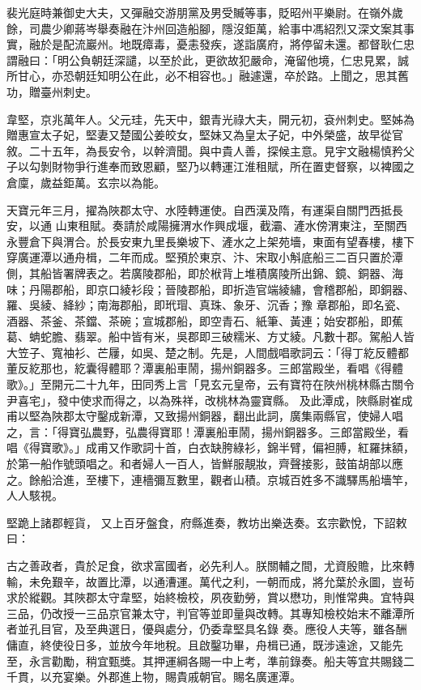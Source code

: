 \begin{pinyinscope}
 裴光庭時兼御史大夫，又彈融交游朋黨及男受贓等事，貶昭州平樂尉。在嶺外歲餘，司農少卿蔣岑舉奏融在汴州回造船腳，隱沒鉅萬，給事中馮紹烈又深文案其事實，融於是配流巖州。地既瘴毒，憂恚發疾，遂詣廣府，將停留未還。都督耿仁忠謂融曰：「明公負朝廷深譴，以至於此，更欲故犯嚴命，淹留他境，仁忠見累，誠所甘心，亦恐朝廷知明公在此，必不相容也。」融遽還，卒於路。上聞之，思其舊功，贈臺州刺史。



 韋堅，京兆萬年人。父元珪，先天中，銀青光祿大夫，開元初，袞州刺史。堅姊為贈惠宣太子妃，堅妻又楚國公姜皎女，堅妹又為皇太子妃，中外榮盛，故早從官敘。二十五年，為長安令，以幹濟聞。與中貴人善，探候主意。見宇文融楊慎矜父子以勾剝財物爭行進奉而致恩顧，堅乃以轉運江淮租賦，所在置吏督察，以裨國之倉廩，歲益鉅萬。玄宗以為能。



 天寶元年三月，擢為陜郡太守、水陸轉運使。自西漢及隋，有運渠自關門西抵長安，以通
 山東租賦。奏請於咸陽擁渭水作興成堰，截灞、滻水傍渭東注，至關西永豐倉下與渭合。於長安東九里長樂坡下、滻水之上架苑墻，東面有望春樓，樓下穿廣運潭以通舟楫，二年而成。堅預於東京、汴、宋取小斛底船三二百只置於潭側，其船皆署牌表之。若廣陵郡船，即於栿背上堆積廣陵所出錦、鏡、銅器、海味；丹陽郡船，即京口綾衫段；晉陵郡船，即折造官端綾繡，會稽郡船，即銅器、羅、吳綾、絳紗；南海郡船，即玳瑁、真珠、象牙、沉香；豫
 章郡船，即名瓷、酒器、茶釜、茶鐺、茶碗；宣城郡船，即空青石、紙筆、黃連；始安郡船，即蕉葛、蚺蛇膽、翡翠。船中皆有米，吳郡即三破糯米、方丈綾。凡數十郡。駕船人皆大笠子、寬袖衫、芒屨，如吳、楚之制。先是，人間戲唱歌詞云：「得丁紇反體都董反紇那也，紇囊得體耶？潭裏船車鬧，揚州銅器多。三郎當殿坐，看唱《得體歌》。」至開元二十九年，田同秀上言「見玄元皇帝，云有寶符在陜州桃林縣古關令尹喜宅」，發中使求而得之，以為殊祥，改桃林為靈寶縣。
 及此潭成，陜縣尉崔成甫以堅為陜郡太守鑿成新潭，又致揚州銅器，翻出此詞，廣集兩縣官，使婦人唱之，言：「得寶弘農野，弘農得寶耶！潭裏船車鬧，揚州銅器多。三郎當殿坐，看唱《得寶歌》。」成甫又作歌詞十首，白衣缺胯綠衫，錦半臂，偏袒膊，紅羅抹額，於第一船作號頭唱之。和者婦人一百人，皆鮮服靚妝，齊聲接影，鼓笛胡部以應之。餘船洽進，至樓下，連檣彌亙數里，觀者山積。京城百姓多不識驛馬船墻竿，人人駭視。



 堅跪上諸郡輕貨，
 又上百牙盤食，府縣進奏，教坊出樂迭奏。玄宗歡悅，下詔敕曰：



 古之善政者，貴於足食，欲求富國者，必先利人。朕關輔之間，尤資殷贍，比來轉輸，未免艱辛，故置比潭，以通漕運。萬代之利，一朝而成，將允葉於永圖，豈茍求於縱觀。其陜郡太守韋堅，始終檢校，夙夜勤勞，賞以懋功，則惟常典。宜特與三品，仍改授一三品京官兼太守，判官等並即量與改轉。其專知檢校始末不離潭所者並孔目官，及至典選日，優與處分，仍委韋堅具名錄
 奏。應役人夫等，雖各酬傭直，終使役日多，並放今年地稅。且啟鑿功畢，舟楫已通，既涉遠途，又能先至，永言勸勵，稍宜甄獎。其押運綱各賜一中上考，準前錄奏。船夫等宜共賜錢二千貫，以充宴樂。外郡進上物，賜貴戚朝官。賜名廣運潭。




\end{pinyinscope}
